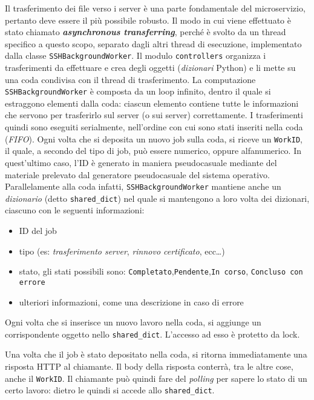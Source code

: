 Il trasferimento dei file verso i server è una parte fondamentale del microservizio,
pertanto deve essere il più possibile robusto.
Il modo in cui viene effettuato è stato chiamato \textbf{\textit{asynchronous transferring}},
perché è svolto da un thread specifico a questo scopo, separato dagli altri thread di
esecuzione, implementato dalla classe \texttt{SSHBackgroundWorker}.
Il modulo \texttt{controllers} organizza i trasferimenti da effettuare e crea degli
oggetti (\textit{dizionari} Python) e li mette su una coda condivisa con il thread di
trasferimento.
La computazione \texttt{SSHBackgroundWorker} è composta da un loop infinito, dentro
il quale si estraggono elementi dalla coda: ciascun elemento contiene tutte le informazioni
che servono per trasferirlo sul server (o sui server) correttamente. I trasferimenti
quindi sono eseguiti serialmente, nell'ordine con cui sono stati inseriti
nella coda (\textit{FIFO}).
Ogni volta che si deposita un nuovo job sulla coda, si riceve un \texttt{WorkID}, il quale,
a secondo del tipo di job, può essere numerico, oppure alfanumerico. In quest'ultimo
caso, l'ID è generato in maniera pseudocasuale mediante del materiale
prelevato dal generatore pseudocasuale del sistema operativo.
Parallelamente alla coda infatti, \texttt{SSHBackgroundWorker} mantiene anche un \textit{dizionario}
(detto \texttt{shared\_dict})
nel quale si mantengono a loro volta dei dizionari, ciascuno con le seguenti informazioni:
\begin{itemize}
    \item ID del job
    \item tipo (es: \textit{trasferimento server}, \textit{rinnovo certificato}, ecc\ldots)
    \item stato, gli stati possibili sono: \texttt{Completato},\texttt{Pendente},\texttt{In corso},
    \texttt{Concluso con errore}
    \item ulteriori informazioni, come una descrizione in caso di errore
\end{itemize}
Ogni volta che si inserisce un nuovo lavoro nella coda, si aggiunge un corrispondente oggetto
nello \texttt{shared\_dict}. L'accesso ad esso è protetto da lock.

Una volta che il job è stato depositato nella coda, si ritorna immediatamente una risposta HTTP
al chiamante. Il body della risposta conterrà, tra le altre cose, anche il \texttt{WorkID}.
Il chiamante può quindi fare del \textit{polling} per sapere lo stato di un certo lavoro: dietro
le quindi si accede allo \texttt{shared\_dict}.

